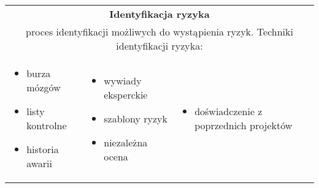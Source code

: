 \documentclass[../main.tex]{subfiles}
\begin{document}
    \begin{table}[H]
        \begin{center}
            \begin{tabular}{| p{5cm} p{5cm} p{5cm} |}
                \hline
                \multicolumn{3}{|c|}{\textbf{Identyfikacja ryzyka}}\\
                \multicolumn{3}{|c|}{proces identyfikacji możliwych do wystąpienia ryzyk. Techniki identyfikacji
                ryzyka:}\\
                \hline
                \begin{itemize}
                    \item burza mózgów
                    \item listy kontrolne
                    \item historia awarii
                \end{itemize}
                &
                \begin{itemize}
                    \item wywiady eksperckie
                    \item szablony ryzyk
                    \item niezależna ocena
                \end{itemize}
                &
                \begin{itemize}
                    \item doświadczenie z poprzednich projektów
                \end{itemize}\\
                \hline
            \end{tabular}
        \end{center}
    \end{table}
\end{document}
